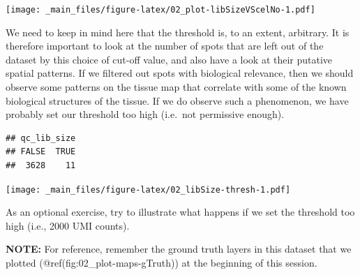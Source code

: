 \documentclass[
]{book}
\newenvironment{Shaded}{\begin{snugshade}}{\end{snugshade}}
\newcommand{\AttributeTok}[1]{\textcolor[rgb]{0.13,0.29,0.53}{#1}}
\newcommand{\DecValTok}[1]{\textcolor[rgb]{0.00,0.00,0.81}{#1}}
\newcommand{\DocumentationTok}[1]{\textcolor[rgb]{0.56,0.35,0.01}{\textbf{\textit{#1}}}}
\newcommand{\FunctionTok}[1]{\textcolor[rgb]{0.13,0.29,0.53}{\textbf{#1}}}
\newcommand{\NormalTok}[1]{#1}
\newcommand{\OtherTok}[1]{\textcolor[rgb]{0.56,0.35,0.01}{#1}}
\newcommand{\SpecialCharTok}[1]{\textcolor[rgb]{0.81,0.36,0.00}{\textbf{#1}}}
\newcommand{\StringTok}[1]{\textcolor[rgb]{0.31,0.60,0.02}{#1}}
\begin{document}
\texttt{[image: \_main\_files/figure-latex/02\_plot-libSizeVScelNo-1.pdf]}

We need to keep in mind here that the threshold is, to an extent, arbitrary. It is therefore important to look at the number of spots that are left out of the dataset by this choice of cut-off value, and also have a look at their putative spatial patterns. If we filtered out spots with biological relevance, then we should observe some patterns on the tissue map that correlate with some of the known biological structures of the tissue. If we do observe such a phenomenon, we have probably set our threshold too high (i.e.~not permissive enough).

\begin{Shaded}
\end{Shaded}

\begin{verbatim}
## qc_lib_size
## FALSE  TRUE 
##  3628    11
\end{verbatim}

\begin{Shaded}
\end{Shaded}

\texttt{[image: \_main\_files/figure-latex/02\_libSize-thresh-1.pdf]}

As an optional exercise, try to illustrate what happens if we set the threshold too high (i.e., 2000 UMI counts).

\textbf{NOTE:} For reference, remember the ground truth layers in this dataset that we plotted (@ref(fig:02\_plot-maps-gTruth)) at the beginning of this session.
\end{document}
